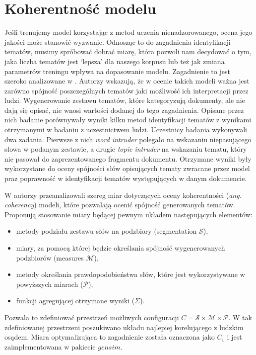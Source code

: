 \documentclass[a4paper,11pt,twoside]{report}
\theoremstyle{definition}
\begin{document}
\section{Koherentność modelu}\label{section:ldacoh}
Jeśli trenujemy model korzystając z metod uczenia nienadzorowanego, ocena jego jakości może stanowić wyzwanie. Odnosząc to do zagadnienia identyfikacji tematów, musimy spróbować dobrać miarę, która pozwoli nam decydować o tym, jaka liczba tematów jest ‘lepsza’ dla naszego korpusu lub też jak zmiana parametrów treningu wpływa na dopasowanie modelu. Zagadnienie to jest szeroko analizowane w \cite{RTL}. Autorzy wskazują, że w ocenie takich modeli ważna jest zarówno spójność poszczególnych tematów jaki możliwość ich interpretacji przez ludzi. Wygenerowanie zestawu tematów, które kategoryzują dokumenty, ale nie dają się opisać, nie wnosi wartości dodanej do tego zagadnienia. Opisane przez nich badanie porównywały wyniki kilku metod identyfikacji tematów z wynikami otrzymanymi w badaniu z uczestnictwem ludzi. Uczestnicy badania wykonywali dwa zadania. Pierwsze z nich \textit{word intruder} polegało na wskazaniu niepasującego słowa w podanym zestawie, a drugie \textit{topic intruder} na wskazaniu tematu, który nie pasował do zaprezentowanego fragmentu dokumentu. Otrzymane wyniki były wykorzystane do oceny spójności słów opisujących tematy zwracane przez model praz poprawność w identyfikacji tematów występujących w danym dokumencie. 

W \cite{COH} autorzy przeanalizowali szereg miar dotyczących oceny koherentności (\textit{ang. coherency}) modeli, które pozwalają ocenić spójność generowanych tematów. Proponują stosowanie miary będącej pewnym układem następujących elementów: 

\begin{itemize}
\item metody podziału zestawu słów na podzbiory (segmentation $\mathcal{S}$),
\item miary, za pomocą której będzie określania spójność wygenerowanych podzbiorów (measures $\mathcal{M}$),
\item metody określania prawdopodobieństwa słów, które jest wykorzystywane w powyższych miarach ($\mathcal{P}$),
\item funkcji agregującej otrzymane wyniki ($\Sigma$).
\end{itemize}
Pozwala to zdefiniować przestrzeń możliwych configuracji $ C = \mathcal{S} \times \mathcal{M} \times \mathcal{P}$. W tak zdefiniowanej przestrzeni poszukiwano układu najlepiej korelującego z ludzkim osądem. Miara optymalizująca to zagadnienie została oznaczona jako $C_v$ i jest zaimplementowana w pakiecie $gensim$. 
\end{document}
